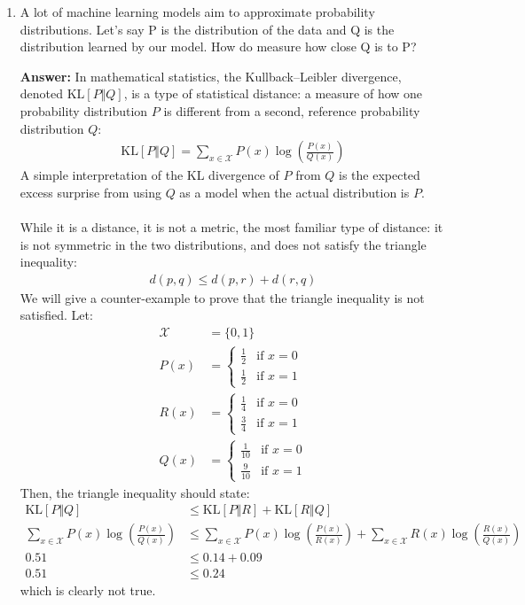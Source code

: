 \documentclass{article}
\newenvironment{QandA}{\begin{enumerate}[label=\arabic*.]}{\end{enumerate}}
\newenvironment{answer}{\par\normalfont \textbf{Answer:}}{}
\newcommand{\KL}[2]{\text{KL}\left[#1 \Vert #2 \right]}
\begin{document}
\begin{QandA}
    \item A lot of machine learning models aim to approximate probability distributions. Let’s say P is the distribution of the data and Q is the distribution learned by our model. How do measure how close Q is to P?
    \begin{answer}
        In mathematical statistics, the Kullback–Leibler divergence, denoted $\KL{P}{Q}$, is a type of statistical distance: a measure of how one probability distribution $P$ is different from a second, reference probability distribution $Q$:
        \begin{align*}
            \KL{P}{Q} = \sum_{x \in \mathcal{X}} P(x) \log \left( \frac{P(x)}{Q(x)} \right)
        \end{align*}
        A simple interpretation of the KL divergence of $P$ from $Q$ is the expected excess surprise from using $Q$ as a model when the actual distribution is $P$. \\\\
        While it is a distance, it is not a metric, the most familiar type of distance: it is not symmetric in the two distributions, and does not satisfy the triangle inequality:
        \begin{align*}
            d(p, q) \le d(p, r) + d(r, q)
        \end{align*}
        We will give a counter-example to prove that the triangle inequality is not satisfied. Let:
        \begin{align*}
            \mathcal{X} &= \{0, 1\} \\
            P(x) &= \begin{cases}
                \frac{1}{2} & \text{if } x = 0 \\
                \frac{1}{2} & \text{if } x = 1
            \end{cases} \\
            R(x) &= \begin{cases}
                \frac{1}{4} & \text{if } x = 0 \\
                \frac{3}{4} & \text{if } x = 1
            \end{cases} \\
            Q(x) &= \begin{cases}
                \frac{1}{10} & \text{if } x = 0 \\
                \frac{9}{10} & \text{if } x = 1
            \end{cases}        
        \end{align*}
        Then, the triangle inequality should state:
        \begin{align*}
            \KL{P}{Q} &\le \KL{P}{R} + \KL{R}{Q} \\
            \sum_{x \in \mathcal{X}} P(x) \log \left( \frac{P(x)}{Q(x)} \right) &\le \sum_{x \in \mathcal{X}} P(x) \log \left( \frac{P(x)}{R(x)} \right) + \sum_{x \in \mathcal{X}} R(x) \log \left( \frac{R(x)}{Q(x)} \right) \\
            0.51 &\le 0.14 + 0.09 \\
            0.51 &\le 0.24
        \end{align*}
        which is clearly not true.


\end{answer}
\end{QandA}
\end{document}
